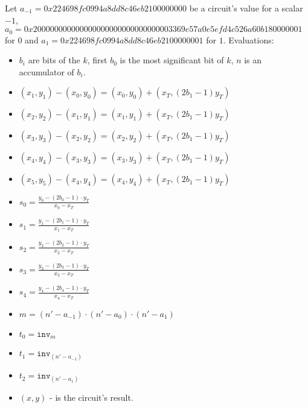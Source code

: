 Let $a_{-1} = 0x224698fc0994a8dd8c46eb2100000000$ be a circuit's value for a scalar $-1$, $a_0 = 0x200000000000000000000000000000003369e57a0e5efd4c526a60b180000001$ for $0$ and $a_1 = 0x224698fc0994a8dd8c46eb2100000001$ for $1$.
Evaluations:
\begin{itemize}
	\item $b_i$ are bits of the $k$, first $b_0$ is the most significant bit of $k$, $n$ is an accumulator of $b_i$.
	\item $(x_1, y_1) - (x_0, y_0) = (x_0, y_0) + (x_T, (2b_1 - 1)y_T)$
	\item $(x_2, y_2) - (x_1, y_1) = (x_1, y_1) + (x_T, (2b_1 - 1)y_T)$
	\item $(x_3, y_3) - (x_2, y_2) = (x_2, y_2) + (x_T, (2b_1 - 1)y_T)$
	\item $(x_4, y_4) - (x_3, y_3) = (x_3, y_3) + (x_T, (2b_1 - 1)y_T)$
	\item $(x_5, y_5) - (x_4, y_4) = (x_4, y_4) + (x_T, (2b_1 - 1)y_T)$
	\item $s_0 = \frac{y_0 - (2b_0 - 1) \cdot y_T}{x_0 - x_T}$
	\item $s_1 = \frac{y_1 - (2b_1 - 1) \cdot y_T}{x_1 - x_T}$
	\item $s_2 = \frac{y_2 - (2b_2 - 1) \cdot y_T}{x_2 - x_T}$
	\item $s_3 = \frac{y_3 - (2b_3 - 1) \cdot y_T}{x_3 - x_T}$
	\item $s_4 = \frac{y_4 - (2b_4 - 1) \cdot y_T}{x_4 - x_T}$
	\item $m = (n' - a_{-1})\cdot(n' - a_0)\cdot(n' - a_1)$
     \item $t_0 = \texttt{inv}_m$
     \item $t_1 = \texttt{inv}_{(n' - a_{-1})}$
     \item $t_2 = \texttt{inv}_{(n'- a_1)}$
     \item $(x,y)$ - is the circuit's result.

\end{itemize}

